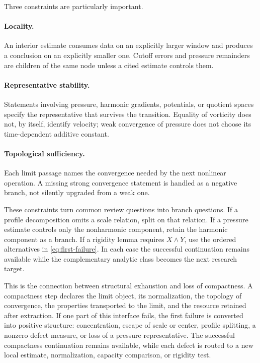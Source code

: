 \documentclass[11pt,reqno]{amsart}
\theoremstyle{plain}
\theoremstyle{definition}
\theoremstyle{remark}
\numberwithin{equation}{section}
\begin{document}
Three constraints are particularly important.

\paragraph{Locality.}
An interior estimate consumes data on an explicitly larger window and produces
a conclusion on an explicitly smaller one.  Cutoff errors and pressure
remainders are children of the same node unless a cited estimate controls them.

\paragraph{Representative stability.}
Statements involving pressure, harmonic gradients, potentials, or quotient
spaces specify the representative that survives the transition.  Equality of
vorticity does not, by itself, identify velocity; weak convergence of pressure
does not choose its time-dependent additive constant.

\paragraph{Topological sufficiency.}
Each limit passage names the convergence needed by the next nonlinear
operation.  A missing strong convergence statement is handled as a negative
branch, not silently upgraded from a weak one.

These constraints turn common review questions into branch questions.  If a
profile decomposition omits a scale relation, split on that relation.  If a
pressure estimate controls only the nonharmonic component, retain the harmonic
component as a branch.  If a rigidity lemma requires \(X\wedge Y\), use the
ordered alternatives in \eqref{eq:first-failure}.  In each case the successful
continuation remains available while the complementary analytic class becomes
the next research target.

This is the connection between structural exhaustion and loss of compactness.
A compactness step declares the limit object, its normalization, the topology
of convergence, the properties transported to the limit, and the resource
retained after extraction.  If one part of this interface fails, the first
failure is converted into positive structure: concentration, escape of scale or
center, profile splitting, a nonzero defect measure, or loss of a pressure
representative.  The successful compactness continuation remains available,
while each defect is routed to a new local estimate, normalization, capacity
comparison, or rigidity test.
\end{document}
